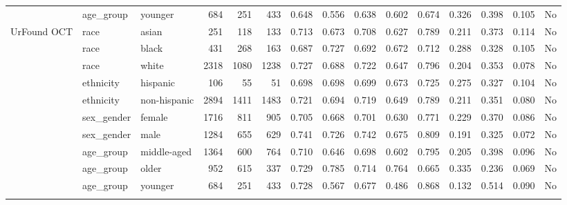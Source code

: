 \begin{longtable}{@{}lllrrrrrrrrrrrr@{}}
 & age\_group & younger & 684 & 251 & 433 & 0.648 & 0.556 & 0.638 & 0.602 & 0.674 & 0.326 & 0.398 & 0.105 & No \\
UrFound OCT & race & asian & 251 & 118 & 133 & 0.713 & 0.673 & 0.708 & 0.627 & 0.789 & 0.211 & 0.373 & 0.114 & No \\
 & race & black & 431 & 268 & 163 & 0.687 & 0.727 & 0.692 & 0.672 & 0.712 & 0.288 & 0.328 & 0.105 & No \\
 & race & white & 2318 & 1080 & 1238 & 0.727 & 0.688 & 0.722 & 0.647 & 0.796 & 0.204 & 0.353 & 0.078 & No \\
 & ethnicity & hispanic & 106 & 55 & 51 & 0.698 & 0.698 & 0.699 & 0.673 & 0.725 & 0.275 & 0.327 & 0.104 & No \\
 & ethnicity & non-hispanic & 2894 & 1411 & 1483 & 0.721 & 0.694 & 0.719 & 0.649 & 0.789 & 0.211 & 0.351 & 0.080 & No \\
 & sex\_gender & female & 1716 & 811 & 905 & 0.705 & 0.668 & 0.701 & 0.630 & 0.771 & 0.229 & 0.370 & 0.086 & No \\
 & sex\_gender & male & 1284 & 655 & 629 & 0.741 & 0.726 & 0.742 & 0.675 & 0.809 & 0.191 & 0.325 & 0.072 & No \\
 & age\_group & middle-aged & 1364 & 600 & 764 & 0.710 & 0.646 & 0.698 & 0.602 & 0.795 & 0.205 & 0.398 & 0.096 & No \\
 & age\_group & older & 952 & 615 & 337 & 0.729 & 0.785 & 0.714 & 0.764 & 0.665 & 0.335 & 0.236 & 0.069 & No \\
 & age\_group & younger & 684 & 251 & 433 & 0.728 & 0.567 & 0.677 & 0.486 & 0.868 & 0.132 & 0.514 & 0.090 & No \\
\botrule
\end{longtable}
\endgroup
